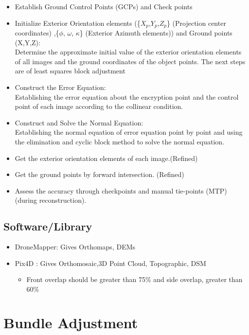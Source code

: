 \documentclass{article}[11pt]
\begin{document}
\begin{itemize}
    \item  Establish Ground Control Points (GCPs) and Check points
    \item Initialize Exterior Orientation elements (\{$X_p$,$Y_p$,$Z_p$\} (Projection center coordinates) ,\{$\phi$, $\omega$, $\kappa$\} (Exterior Azimuth elements)) and Ground points (X,Y,Z):
    \\ Determine the approximate initial value of the exterior orientation elements of all images and
    the ground coordinates of the object points.
    The next steps are of least squares block adjustment
    \item Construct the Error Equation: 
    \\ Establishing the error equation about the encryption point and the control point of each image
    according to the collinear condition.
    \item Construct and Solve the Normal Equation: 
    \\ Establishing the normal equation of error equation point by point and using the elimination and cyclic block method to solve the normal equation.
    \item  Get the exterior orientation elements of each image.(Refined)
    \item Get the ground points by forward intersection. (Refined)
    \item Assess the accuracy through checkpoints and manual tie-points (MTP) (during reconstruction).

\end{itemize}


\subsection{Software/Library}
\begin{itemize}
    \item DroneMapper: Gives Orthomaps, DEMs
    \item Pix4D : Gives Orthomosaic,3D Point Cloud, Topographic, DSM
    \begin{itemize}
        \item Front overlap should be greater than 75\% and side overlap, greater than 60\%
    \end{itemize}
    
\end{itemize}

\section{Bundle Adjustment}
\end{document}
